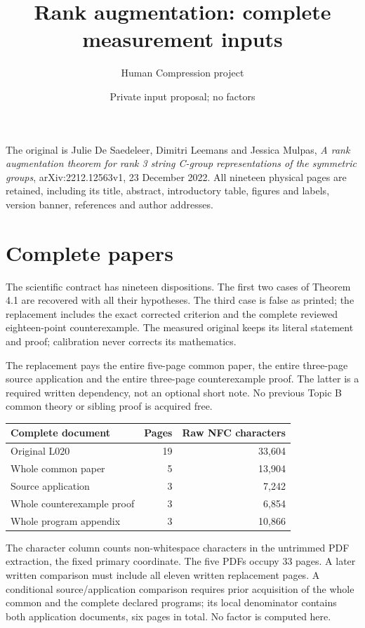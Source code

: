 \documentclass[a4paper,11pt]{article}
\title{Rank augmentation: complete measurement inputs}
\author{Human Compression project}\date{Private input proposal; no factors}
\begin{document}
\maketitle\raggedright
The original is Julie De Saedeleer, Dimitri Leemans and Jessica Mulpas,
\emph{A rank augmentation theorem for rank 3 string C-group representations
of the symmetric groups}, arXiv:2212.12563v1, 23 December 2022. All nineteen
physical pages are retained, including its title, abstract, introductory table,
figures and labels, version banner, references and author addresses.

\section*{Complete papers}
The scientific contract has nineteen dispositions. The first two cases of
Theorem 4.1 are recovered with all their hypotheses. The third case is false
as printed; the replacement includes the exact corrected criterion and the
complete reviewed eighteen-point counterexample. The measured original keeps
its literal statement and proof; calibration never corrects its mathematics.

The replacement pays the entire five-page common paper, the entire three-page
source application and the entire three-page counterexample proof. The latter
is a required written dependency, not an optional short note. No previous
Topic B common theory or sibling proof is acquired free.
\begin{center}\begin{tabular}{@{}lrr@{}}\toprule Complete document & Pages & Raw NFC characters\\\midrule
Original L020 &19&33,604\\
Whole common paper &5&13,904\\
Source application &3&7,242\\
Whole counterexample proof &3&6,854\\
Whole program appendix &3&10,866\\\bottomrule\end{tabular}\end{center}
The character column counts non-whitespace characters in the untrimmed PDF
extraction, the fixed primary coordinate. The five PDFs occupy 33 pages. A
later written comparison must include all eleven written replacement pages.
A conditional source/application comparison requires prior acquisition of the
whole common and the complete declared programs; its local denominator contains
both application documents, six pages in total. No factor is computed here.
\end{document}
